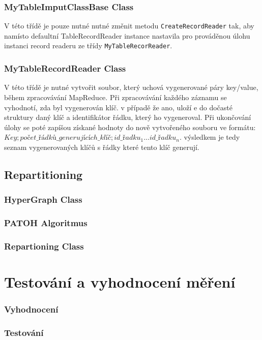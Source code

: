 \documentclass[thesis=M,czech]{FITthesis}[2012/06/26]
\begin{document}
\subsection{MyTableImputClassBase Class}
V této třídě je pouze nutné nutné změnit metodu \texttt{CreateRecordReader} tak, aby namísto defaultní TableRecordReader instance nastavila pro prováděnou úlohu instanci record readeru ze třídy \texttt{MyTableRecorReader}.


\subsection{MyTableRecordReader Class}
V této třídě je nutné vytvořit soubor, který uchová vygenerované páry key/value, během zpracovávání MapReduce. Při zpracovávání každého záznamu se vyhodnotí, zda byl vygenerován klíč. v případě že ano, uloží e do dočasté struktury daný klíč a identifikátor řádku, který ho vygeneroval. Při ukončování úlohy se poté zapíšou získané hodnoty do nově vytvořeného souboru ve formátu: $Key;počet\_řádků\_generujících\_klíč;id\_řadku_1 ... id\_řadku_n$. výsledkem je tedy seznam vygenerovaných klíčů s řádky které tento klíč generují.


\section{Repartitioning}
\subsection{HyperGraph Class}
\subsection{PATOH Algoritmus}
\subsection{Repartioning Class}

\chapter{Testování a vyhodnocení měření}
\subsection{Vyhodnocení}
\subsection{Testování}
\end{document}
